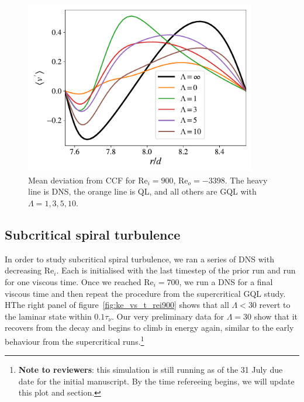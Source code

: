 \documentclass[openacc]{rstransa}%
\newcommand{\Reyn}{\mathrm{Re}}
\begin{document}
\begin{figure}
    \centering
    \includegraphics[width=0.9\textwidth]{figs/rei900_reo_-3398_vmean_profile.pdf}
    \caption{Mean deviation from CCF for $\Reyn_i = 900$, $\Reyn_o=-3398$. The heavy line is DNS, the orange line is QL, and all others are GQL with $\Lambda = 1,3,5,10$.}
    \label{fig:rei900_vmean}
\end{figure}

\subsection{Subcritical spiral turbulence}
In order to study subcritical spiral turbulence, we ran a series of DNS with decreasing $\Reyn_i$. Each is initialised with the last timestep of the prior run and run for one viscous time. Once we reached $\Reyn_i = 700$, we run a DNS for a final viscous time and then repeat the procedure from the supercritical GQL study. HThe right panel of figure~\ref{fig:ke_vs_t_rei900} shows  that all $\Lambda < 30$ revert to the laminar state within $0.1 \tau_\nu$. Our very preliminary data for $\Lambda = 30$ show that it recovers from the decay and begins to climb in energy again, similar to the early behaviour from the supercritical runs.\footnote{\textbf{Note to reviewers}: this simulation is still running as of the 31 July due date for the initial manuscript. By the time refereeing begins, we will update this plot and section.}
\end{document}
